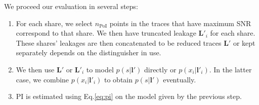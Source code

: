 \documentclass{llncs}
\begin{document}
We proceed our evaluation in several steps:
\begin{enumerate}
	\item For each share, we select $n_{\text{PoI}}$ points in the traces that have maximum SNR correspond to that share. We then have truncated leakage $\bm{L}'_i$ for each share. These shares' leakages are then concatenated to be reduced traces $\bm{L}'$ or kept separately depends on the distinguisher in use.
	\item We then use $\bm{L}'$ or $\bm{L}'_i$ to model $p(s|\bm{l}')$ directly or $p(x_i|\bm{l}'_i)$. In the latter case, we combine $p(x_i|\bm{l}'_i)$ to obtain $p(s|\bm{l}')$ eventually.
	\item PI is estimated using Eq.\ref{eq:pi} on the model given by the previous step.
\end{enumerate}
\end{document}
